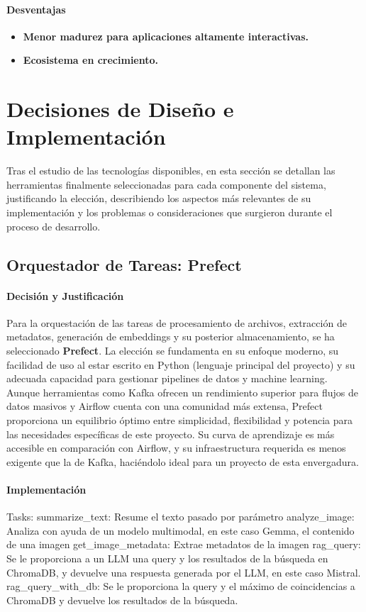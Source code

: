 \paragraph{Desventajas}
\begin{itemize}
\item \textbf{Menor madurez para aplicaciones altamente interactivas.}
\item \textbf{Ecosistema en crecimiento.}
\end{itemize}

\clearpage
\section{Decisiones de Diseño e Implementación}
\label{sec:decisiones_implementacion}
Tras el estudio de las tecnologías disponibles, en esta sección se detallan las herramientas finalmente seleccionadas para cada componente del sistema, justificando la elección, describiendo los aspectos más relevantes de su implementación y los problemas o consideraciones que surgieron durante el proceso de desarrollo.

\subsection{Orquestador de Tareas: Prefect}
\label{subsec:decision_prefect}
\paragraph{Decisión y Justificación}
Para la orquestación de las tareas de procesamiento de archivos, extracción de metadatos, generación de embeddings y su posterior almacenamiento, se ha seleccionado \textbf{Prefect}. La elección se fundamenta en su enfoque moderno, su facilidad de uso al estar escrito en Python (lenguaje principal del proyecto) y su adecuada capacidad para gestionar pipelines de datos y machine learning. Aunque herramientas como Kafka ofrecen un rendimiento superior para flujos de datos masivos y Airflow cuenta con una comunidad más extensa, Prefect proporciona un equilibrio óptimo entre simplicidad, flexibilidad y potencia para las necesidades específicas de este proyecto. Su curva de aprendizaje es más accesible en comparación con Airflow, y su infraestructura requerida es menos exigente que la de Kafka, haciéndolo ideal para un proyecto de esta envergadura.

\paragraph{Implementación}
Tasks:
summarize_text: Resume el texto pasado por parámetro
analyze_image: Analiza con ayuda de un modelo multimodal, en este caso Gemma, el contenido de una imagen
get_image_metadata: Extrae metadatos de la imagen
rag_query: Se le proporciona a un LLM una query y los resultados de la búsqueda en ChromaDB, y devuelve una respuesta generada por el LLM, en este caso Mistral.
rag_query_with_db: Se le proporciona la query y el máximo de coincidencias a ChromaDB y devuelve los resultados de la búsqueda.

